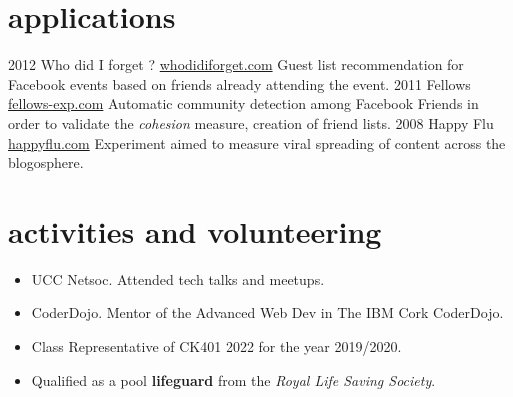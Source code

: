 \documentclass[]{friggeri-cv}
\begin{document}
\section{applications}

\begin{entrylist}
  \entry
    {2012}
    {Who did I forget ?}
    {\href{http://whodidiforget.com}{whodidiforget.com}}
    {Guest list recommendation for Facebook events based on friends already attending the event.}
  \entry
    {2011}
    {Fellows}
    {\href{http://fellows-exp.com}{fellows-exp.com}}
    {Automatic community detection among Facebook Friends in order to validate the \emph{cohesion} measure, creation of friend lists.}
  \entry
    {2008}
    {Happy Flu}
    {\href{http://happyflu.com}{happyflu.com}}
    {Experiment aimed to measure viral spreading of content across the blogosphere.}
\end{entrylist}

\section{activities and volunteering}
\begin{itemize}
    \item UCC Netsoc. Attended tech talks and meetups.
    \item CoderDojo. Mentor of the Advanced Web Dev in The IBM Cork CoderDojo.
    \item Class Representative of CK401 2022 for the year 2019/2020.
    \item Qualified as a pool \textbf{lifeguard} from the \textit{Royal Life Saving Society}.
\end{itemize}

% 
\end{document}
